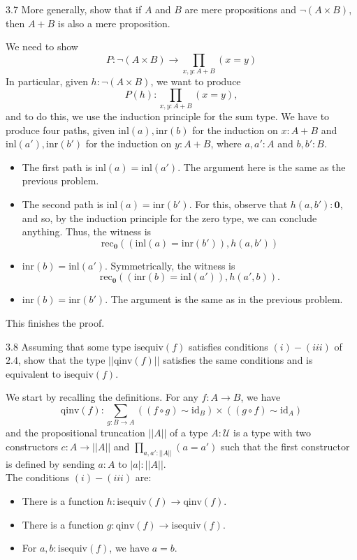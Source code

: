 \documentclass[14pt]{extarticle}
\newcommand{\0}{{\mathbf 0}}
\newcommand{\1}{{\mathbf 1}}
\newcommand{\2}{{\mathbf 2}}
\newcommand{\UU}{{\mathcal U}}
\newcommand{\rec}{\mathrm{rec}}
\newcommand{\inl}{\mathrm{inl}}
\newcommand{\inr}{\mathrm{inr}}
\newcommand{\id}{\mathrm{id}}
\newcommand{\isequiv}{\mathrm{isequiv}}
\newcommand{\qinv}{\mathrm{qinv}}
\begin{document}
\begin{prob}{3.7}{}
More generally, show that if $A$ and $B$ are mere propositions and $\neg(A \times B)$, then $A + B$ is also a mere proposition.
\end{prob}
We need to show 
\[P : \neg (A \times B) \to \prod_{x,y:A+B}(x = y)\]
In particular, given $h : \neg(A \times B)$, we want to produce
\[P(h) : \prod_{x,y:A+B}(x = y),\] and to do this, we use the induction principle for the sum type. We have to produce four paths, given $\inl(a),\inr(b)$ for the induction on $x : A+B$ and $\inl(a'),\inr(b')$ for the induction on $y : A+B$, where $a,a' : A$ and $b,b':B$.
\begin{itemize}
\item [1)] The first path is $\inl(a) = \inl(a')$.
The argument here is the same as the previous problem.
\item [2)] The second path is $\inl(a) = \inr(b')$. For this, observe that $h(a,b') : \0$, and so, by the induction principle for the zero type, we can conclude anything. Thus, the witness is
\[\rec_\0((\inl(a) = \inr(b')), h(a,b'))\]
\item [3)] $\inr(b) = \inl(a')$. Symmetrically, the witness is \[\rec_\0((\inr(b) = \inl(a')), h(a',b)).\]
\item [4)] $\inr(b) = \inr(b')$. The argument is the same as in the previous problem.
\end{itemize}
This finishes the proof.


\begin{prob}{3.8}{}
Assuming that some type $\isequiv(f)$ satisfies conditions $(i)-(iii)$ of $2.4$, show that the type $||\qinv(f)||$ satisfies the same conditions and is equivalent to $\isequiv(f)$.
\end{prob}
We start by recalling the definitions. For any $f : A \to B$, we have
\[\qinv(f) : \sum_{g : B \to A}((f \circ g) \sim \id_{B}) \times ((g \circ f) \sim \id_{A})\] and the propositional truncation $||A||$ of a type $A : \UU$ is a type with two constructors $c : A \to ||A||$ and $\prod_{a,a' :||A||}(a = a') $ such that the first constructor is defined by sending $a : A$ to $|a| : ||A||$.\\
The conditions $(i)-(iii)$ are:
\begin{itemize}
\item [(i)] There is a function $h : \isequiv(f) \to \qinv(f)$.
\item [(ii)] There is a function $g : \qinv(f) \to \isequiv(f)$.
\item [(iii)] For $a,b : \isequiv(f)$, we have $a = b$.
\end{itemize}
\end{document}
